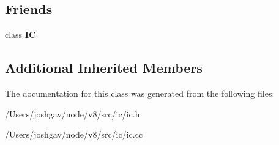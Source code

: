 \subsection*{Friends}
\begin{DoxyCompactItemize}
\item 
class {\bfseries IC}\hypertarget{classv8_1_1internal_1_1_compare_i_c_ae59e849648858af1fd22081890d47b78}{}\label{classv8_1_1internal_1_1_compare_i_c_ae59e849648858af1fd22081890d47b78}

\end{DoxyCompactItemize}
\subsection*{Additional Inherited Members}


The documentation for this class was generated from the following files\+:\begin{DoxyCompactItemize}
\item 
/\+Users/joshgav/node/v8/src/ic/ic.\+h\item 
/\+Users/joshgav/node/v8/src/ic/ic.\+cc\end{DoxyCompactItemize}

